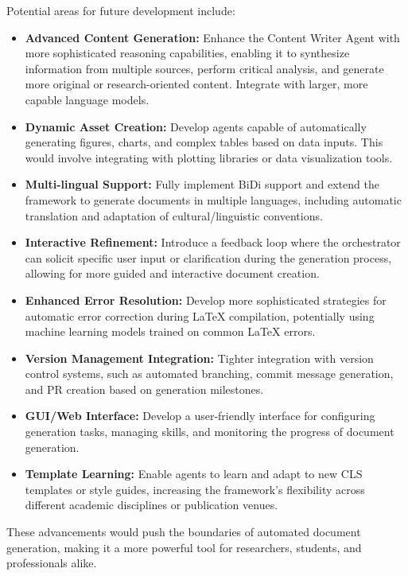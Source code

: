 \documentclass{custom-academic-template}
\begin{document}
Potential areas for future development include:
\begin{itemize}
    \item 	\textbf{Advanced Content Generation:} Enhance the Content Writer Agent with more sophisticated reasoning capabilities, enabling it to synthesize information from multiple sources, perform critical analysis, and generate more original or research-oriented content. Integrate with larger, more capable language models.
    \item 	\textbf{Dynamic Asset Creation:} Develop agents capable of automatically generating figures, charts, and complex tables based on data inputs. This would involve integrating with plotting libraries or data visualization tools.
    \item 	\textbf{Multi-lingual Support:} Fully implement BiDi support and extend the framework to generate documents in multiple languages, including automatic translation and adaptation of cultural/linguistic conventions.
    \item 	\textbf{Interactive Refinement:} Introduce a feedback loop where the orchestrator can solicit specific user input or clarification during the generation process, allowing for more guided and interactive document creation.
    \item 	\textbf{Enhanced Error Resolution:} Develop more sophisticated strategies for automatic error correction during LaTeX compilation, potentially using machine learning models trained on common LaTeX errors.
    \item 	\textbf{Version Management Integration:} Tighter integration with version control systems, such as automated branching, commit message generation, and PR creation based on generation milestones.
    \item 	\textbf{GUI/Web Interface:} Develop a user-friendly interface for configuring generation tasks, managing skills, and monitoring the progress of document generation.
    \item 	\textbf{Template Learning:} Enable agents to learn and adapt to new CLS templates or style guides, increasing the framework's flexibility across different academic disciplines or publication venues.
\end{itemize}
These advancements would push the boundaries of automated document generation, making it a more powerful tool for researchers, students, and professionals alike.

\newpage
\appendix
\end{document}
